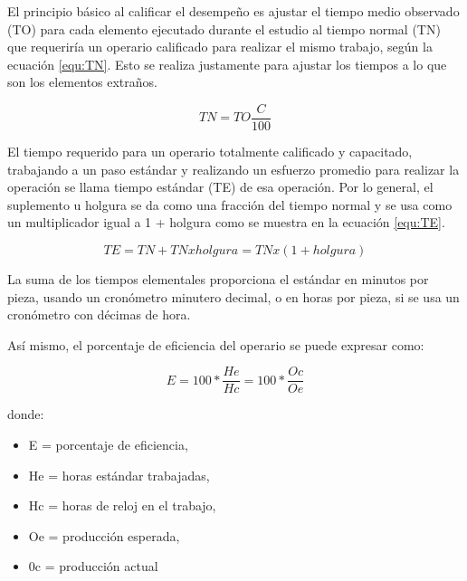     
    
    
    
    El principio básico al calificar el desempeño es ajustar el tiempo medio observado (TO) para cada elemento ejecutado durante el estudio al tiempo normal (TN) que requeriría un operario calificado para realizar el mismo trabajo, según la ecuación \ref{equ:TN}. Esto se realiza justamente para ajustar los tiempos a lo que son los elementos extraños. \cite{niebel1980ingenieria}
    
    
    \begin{equation}
        \label{equ:TN}
       TN= TO  \frac{C}{100}
    \end{equation}
    
    
    El tiempo requerido para un operario totalmente calificado y capacitado, trabajando a un paso estándar y realizando un esfuerzo promedio para realizar la operación se llama tiempo estándar (TE) de esa operación. Por lo general, el suplemento u holgura se da como una fracción del tiempo normal y se usa como un multiplicador igual a 1 + holgura como se muestra en la ecuación \ref{equ:TE}.\cite{niebel1980ingenieria}
    
    
    \begin{equation}
        \label{equ:TE}
       TE = TN + TN x holgura = TN x (1 + holgura)
    \end{equation}
    
    
    La suma de los tiempos elementales proporciona el estándar en minutos por pieza, usando un cronómetro minutero decimal, o en horas por pieza, si se usa un cronómetro con décimas de hora.\cite{niebel1980ingenieria}
    
    Así mismo, el porcentaje de eficiencia del operario se puede expresar como:
    
    \begin{equation}
        \label{equ:Eficiencia}
       E= 100 * \frac{He}{Hc} = 100 * \frac{Oc}{Oe}
    \end{equation}
    
    donde:
    \begin{itemize}
        \item E = porcentaje de eficiencia,
        \item He = horas estándar trabajadas,
        \item Hc = horas de reloj en el trabajo,
        \item Oe = producción esperada,
        \item 0c = producción actual
    \end{itemize}
    
